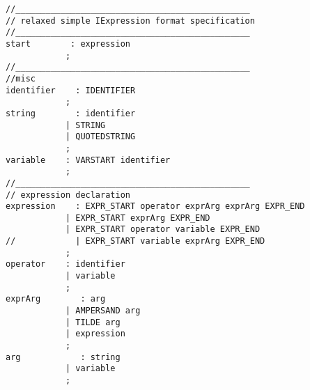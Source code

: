 \begin{verbatim}
//_______________________________________________
// relaxed simple IExpression format specification
//_______________________________________________
start        : expression            
            ;
//_______________________________________________
//misc
identifier    : IDENTIFIER            
            ;
string        : identifier
            | STRING                
            | QUOTEDSTRING            
            ;
variable    : VARSTART identifier    
            ;
//_______________________________________________
// expression declaration
expression    : EXPR_START operator exprArg exprArg EXPR_END    
            | EXPR_START exprArg EXPR_END                    
            | EXPR_START operator variable EXPR_END            
//            | EXPR_START variable exprArg EXPR_END            
            ;
operator    : identifier
            | variable    
            ;
exprArg        : arg
            | AMPERSAND arg    
            | TILDE arg    
            | expression
            ;
arg            : string    
            | variable    
            ;
\end{verbatim}
